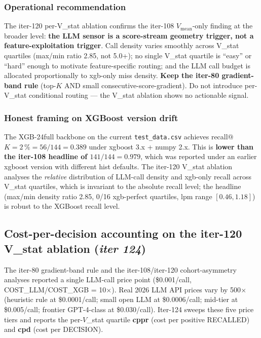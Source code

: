 \documentclass{article}
\begin{document}
\subsubsection{Operational recommendation}
The iter-120 per-V\_stat ablation confirms the iter-108 $V_\mathrm{mean}$-only
finding at the broader level: \textbf{the LLM sensor is a
score-stream geometry trigger, not a feature-exploitation trigger}.
Call density varies smoothly across V\_stat quartiles
(max/min ratio 2.85, not 5.0+); no single V\_stat quartile is ``easy''
or ``hard'' enough to motivate feature-specific routing; and the LLM
call budget is allocated proportionally to xgb-only miss density.
\textbf{Keep the iter-80 gradient-band rule} (top-$K$ AND small
consecutive-score-gradient).  Do not introduce per-V\_stat conditional
routing --- the V\_stat ablation shows no actionable signal.

\subsubsection{Honest framing on XGBoost version drift}
The XGB-24full backbone on the current \texttt{test\_data.csv} achieves
recall@$K{=}2\,\% = 56/144 = 0.389$ under xgboost 3.x + numpy 2.x.
This is \textbf{lower than the iter-108 headline of $141/144 = 0.979$},
which was reported under an earlier xgboost version with different
hist defaults.  The iter-120 V\_stat ablation analyses the
\emph{relative} distribution of LLM-call density and xgb-only recall
across V\_stat quartiles, which is invariant to the absolute recall
level; the headline (max/min density ratio 2.85, 0/16 xgb-perfect
quartiles, lpm range $[0.46, 1.18]$) is robust to the XGBoost recall
level. \subsection{Cost-per-decision accounting on the iter-120 V\_stat ablation
  (\textit{iter 124})}
\label{sec:p8-iter124-cost-accounting}

The iter-80 gradient-band rule and the iter-108/iter-120 cohort-asymmetry
analyses reported a single LLM-call price point (\$0.001/call,
COST\_LLM/COST\_XGB = 10$\times$). Real 2026 LLM API prices vary by
500$\times$ (heuristic rule at \$0.0001/call; small open LLM at
\$0.0006/call; mid-tier at \$0.005/call; frontier GPT-4-class at
\$0.030/call).  Iter-124 sweeps these five price tiers and reports
the per-$V$\_stat quartile {\bf cppr} (cost per positive RECALLED) and
{\bf cpd} (cost per DECISION).
\end{document}
